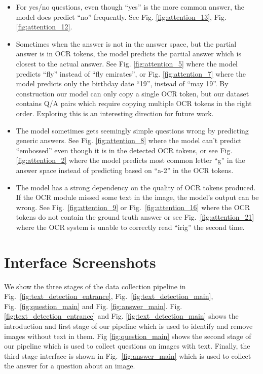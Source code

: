 \documentclass[10pt,twocolumn,letterpaper]{article}
\begin{document}
\begin{itemize}
    \item For yes/no questions, even though ``yes'' is the more common answer, the model does predict ``no'' frequently. See Fig. \ref{fig:attention_13}, Fig. \ref{fig:attention_12}.
    \item Sometimes when the answer is not in the answer space, but the partial answer is in OCR tokens, the model predicts the partial answer which is closest to the actual answer. See Fig. \ref{fig:attention_5} where the model predicts ``fly'' instead of ``fly emirates'', or Fig. \ref{fig:attention_7} where the model predicts only the birthday date ``19'', instead of ``may 19''. By construction our model can only copy a single OCR token, but our \datasetName dataset contains Q/A pairs which require copying multiple OCR tokens in the right order. Exploring this is an interesting direction for future work.
    \item The model sometimes gets seemingly simple questions wrong by predicting generic answers. See Fig. \ref{fig:attention_8} where the model can't predict ``embossed'' even though it is in the detected OCR tokens, or see Fig. \ref{fig:attention_2} where the model predicts most common letter ``g'' in the answer space instead of predicting based on ``a-2'' in the OCR tokens.
    \item The model has a strong dependency on the quality of OCR tokens produced. If the OCR module missed some text in the image, the model's output can be wrong. See Fig.~\ref{fig:attention_9} or Fig.~\ref{fig:attention_16} where the OCR tokens do not contain the ground truth answer or see Fig.~\ref{fig:attention_21} where the OCR system is unable to correctly read ``irig'' the second time.
\end{itemize}

\section{Interface Screenshots}

We show the three stages of the data collection pipeline in Fig.~\ref{fig:text_detection_entrance}, Fig.~\ref{fig:text_detection_main}, Fig.~\ref{fig:question_main} and Fig. \ref{fig:answer_main}. Fig. \ref{fig:text_detection_entrance} and Fig. \ref{fig:text_detection_main} shows the introduction and first stage of our pipeline which is used to identify and remove images without text in them. Fig \ref{fig:question_main} shows the second stage of our pipeline which is used to collect questions on images with text. Finally, the third stage interface is shown in Fig.~\ref{fig:answer_main} which is used to collect the answer for a question about an image.
\end{document}
